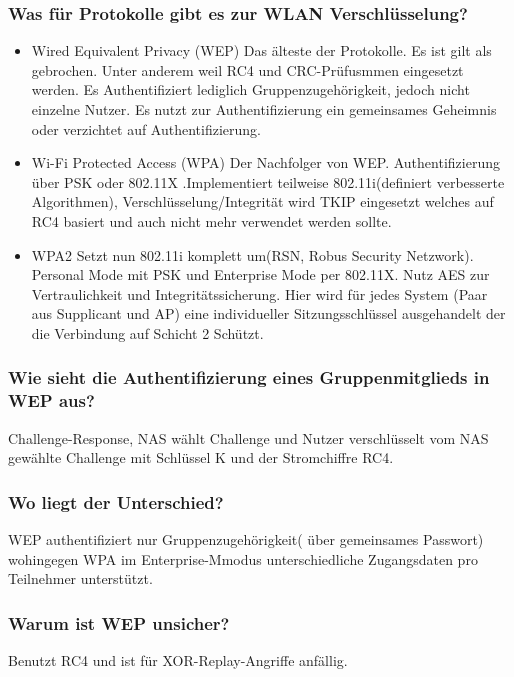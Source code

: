 		\subsubsection{Was für Protokolle gibt es zur WLAN Verschlüsselung?}
	\begin{itemize}
	\item Wired Equivalent Privacy (WEP) Das älteste der Protokolle. Es ist gilt als gebrochen. Unter anderem weil RC4 und CRC-Prüfusmmen eingesetzt werden. Es Authentifiziert lediglich Gruppenzugehörigkeit, jedoch nicht einzelne Nutzer. Es nutzt zur Authentifizierung ein gemeinsames Geheimnis oder verzichtet auf Authentifizierung.
	\item Wi-Fi Protected Access (WPA) Der Nachfolger von WEP. Authentifizierung über PSK oder 802.11X .Implementiert teilweise 802.11i(definiert verbesserte Algorithmen), Verschlüsselung/Integrität wird TKIP eingesetzt welches auf RC4 basiert und auch nicht mehr verwendet werden sollte.
	\item{WPA2} Setzt nun 802.11i komplett um(RSN, Robus Security Netzwork). Personal Mode mit PSK und Enterprise Mode per 802.11X. Nutz AES zur Vertraulichkeit und Integritätssicherung.  Hier wird für jedes System (Paar aus Supplicant und AP) eine individueller Sitzungsschlüssel ausgehandelt der die Verbindung auf Schicht 2 Schützt.
\end{itemize}	

	\subsubsection{Wie sieht die Authentifizierung eines Gruppenmitglieds in WEP aus?}
	Challenge-Response, NAS wählt Challenge und Nutzer verschlüsselt vom NAS gewählte Challenge mit Schlüssel K und der Stromchiffre RC4.	
	
	
	\subsubsection{Wo liegt der Unterschied?}
	WEP authentifiziert nur Gruppenzugehörigkeit( über gemeinsames Passwort) wohingegen WPA im Enterprise-Mmodus unterschiedliche Zugangsdaten pro Teilnehmer unterstützt.
	
	\subsubsection{Warum ist WEP unsicher?}
	Benutzt RC4  und ist für XOR-Replay-Angriffe anfällig. %
	
